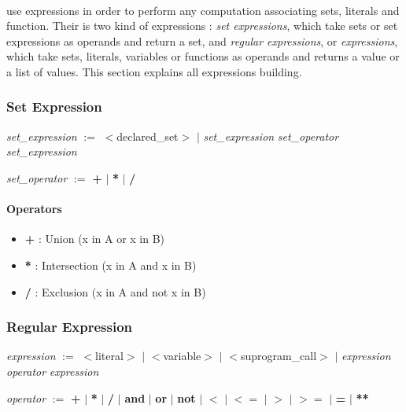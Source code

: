 \label {expression_def}

\paragraph{}
\real{} use expressions in order to perform any computation associating
sets, literals and function. Their is two kind of expressions : \textit{set 
expressions}, which take sets or set expressions as operands and return a
set, and \textit{regular expressions}, or \textit{expressions}, which take
sets, literals, variables or functions as operands and returns a value or 
a list of values. This section explains all expressions building.

\subsubsection {Set Expression}

\textit{set\_expression} $:=$ $<$declared\_set$>$ $|$ \textit{set\_expression} \textit{set\_operator} \textit{set\_expression}

\textit{set\_operator} $:=$ \textbf{+} $|$ \textbf{*} $|$ \textbf{/}

\paragraph{Operators}
\begin {itemize}
\item \textbf{+} : Union (x in A or x in B)
\item \textbf{*} : Intersection (x in A and x in B)
\item \textbf{/} : Exclusion (x in A and not x in B)
\end {itemize}

\subsubsection {Regular Expression}

\textit{expression} $:=$ $<$literal$>$ $|$ $<$variable$>$ $|$ $<$suprogram\_call$>$ $|$ \textit{expression} \textit{operator} \textit{expression}

\textit{operator} $:=$ \textbf{+} $|$ \textbf{*} $|$ \textbf{/} $|$ \textbf{and} $|$ \textbf{or} $|$ \textbf{not} $|$ \textbf{$<$} $|$ \textbf{$<=$} $|$ \textbf{$>$} $|$ \textbf{$>=$} $|$ \textbf{=} $|$ \textbf{**} 

